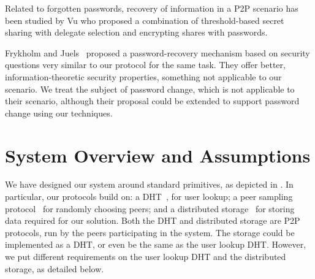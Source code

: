 
Related to forgotten passwords, recovery of information in a
P2P scenario has been studied by Vu\etal \cite{Vu_Aberer_Buchegger_Datta_2009}
who proposed a combination of threshold-based secret sharing with delegate
selection and encrypting shares with passwords.

Frykholm and Juels~\cite{FrykholmJ01} proposed a password-recovery mechanism
based on security questions very similar to our protocol for the same task.
They offer better, information-theoretic security properties, something
not applicable to our scenario. %
We treat the subject of password change, which is not
applicable to their scenario, although their proposal could be extended to support
password change using our techniques.

\section{System Overview and Assumptions} 

We have designed our system around standard primitives, as
depicted in .  In particular, our protocols
build on: a DHT~\cite{WehrleGR05,JimenezOK11}, for user lookup; a peer sampling
protocol~\cite{JelasityVGKS07,BortnikovGKKS09} for randomly choosing peers; and a distributed
storage~\cite{BennettGHP02,RheaEGWZK03} for storing data required for our
solution. Both the DHT and distributed storage are P2P protocols, run by the
peers participating in the system. The storage could be implemented as a DHT,
or even be the same as the user lookup DHT. However, we put different
requirements on the user lookup DHT and the distributed storage, as detailed
below.

